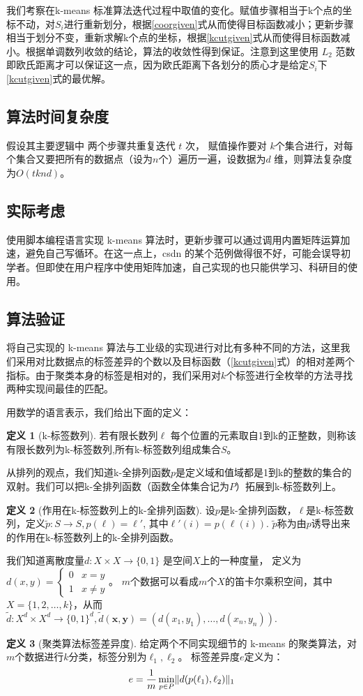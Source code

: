 \documentclass{ctexart}
\DeclarePairedDelimiter\norm{\lVert}{\rVert}
\theoremstyle{definition}
\newtheorem{definition}{定义}
\theoremstyle{remark}
\begin{document}
我们考察在k-means 标准算法迭代过程中取值的变化。赋值步骤相当于k个点的坐标不动，对$S_i$进行重新划分，根据\eqref{coorgiven}式从而使得目标函数减小；更新步骤相当于划分不变，重新求解k个点的坐标，根据\eqref{kcutgiven}式从而使得目标函数减小。根据单调数列收敛的结论，算法的收敛性得到保证。注意到这里使用 $L_2$ 范数即欧氏距离才可以保证这一点，因为欧氏距离下各划分的质心才是给定$S_i$下\eqref{kcutgiven}式的最优解。

\subsection{算法时间复杂度}
假设其主要逻辑中 两个步骤共重复迭代 $t$ 次， 赋值操作要对 $k$个集合进行，对每个集合又要把所有的数据点（设为$n$个）遍历一遍，设数据为$d$ 维，则算法复杂度为$O(tknd)$。
\subsection{实际考虑}
使用脚本编程语言实现 k-means 算法时，更新步骤可以通过调用内置矩阵运算加速，避免自己写循环。在这一点上，csdn 的某个范例\cite{kmeans-csdn}做得很不好，可能会误导初学者。但即使在用户程序中使用矩阵加速，自己实现的也只能供学习、科研目的使用。
\subsection{算法验证}\label{verification}
将自己实现的 k-means 算法与工业级的实现进行对比有多种不同的方法，这里我们采用对比数据点的标签差异的个数以及目标函数（\eqref{kcutgiven}式）的相对差两个指标。由于聚类本身的标签是相对的，我们采用对$k$个标签进行全枚举的方法寻找两种实现间最佳的匹配。

用数学的语言表示，我们给出下面的定义：
\begin{definition}[k-标签数列]
若有限长数列$\ell$ 每个位置的元素取自1到k的正整数，则称该有限长数列为k-标签数列,所有k-标签数列组成集合$S$。
\end{definition}
从排列的观点，我们知道k-全排列函数$p$是定义域和值域都是1到k的整数的集合的双射。我们可以把k-全排列函数（函数全体集合记为$P$）拓展到k-标签数列上。
\begin{definition}[作用在k-标签数列上的k-全排列函数]
设$p$是k-全排列函数，$\ell$是k-标签数列，定义$\tilde{p}:S\to S,p(\ell)=\ell'$, 其中$\ell'(i)=p(\ell(i))$. $\tilde{p}$称为由$p$诱导出来的作用在k-标签数列上的k-全排列函数。
\end{definition}
我们知道离散度量$d:X\times X\to \{0,1\}$ 是空间$X$上的一种度量， 定义为 $ d(x,y)=\begin{cases}0 & x=y \\ 1 & x\neq y \end{cases}$。
$m$个数据可以看成$m$个$X$的笛卡尔乘积空间，其中$X=\{1,2,\dots,k\}$，从而$\tilde{d}: X^d \times X^d \to \{0,1\}^d,\tilde{d}(\bm{x},\bm{y})=(d(x_1,y_1), \dots, d(x_n,y_n)).$ 
\begin{definition}[聚类算法标签差异度]\label{def:label_diff}
给定两个不同实现细节的 k-means 的聚类算法，对$m$个数据进行$k$分类，标签分别为$\ell_1,\ell_2$。
标签差异度$e$定义为：
\begin{equation}
e= \frac{1}{m}\min_{p\in P} \norm{d(p(\ell_1),\ell_2)}_1
\end{equation}
\end{definition}
\end{document}
